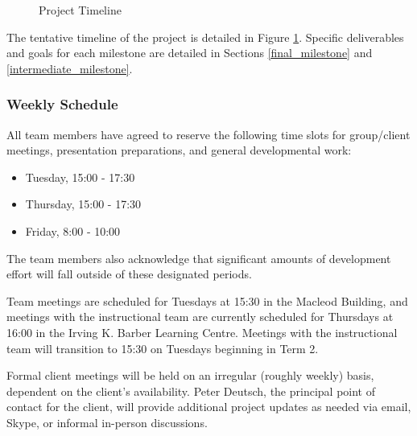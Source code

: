 \begin{figure}[H]
       \caption{Project Timeline}\label{fig:timeline}
\end{figure}

The tentative timeline of the project is detailed in Figure \ref{fig:timeline}. Specific deliverables and goals for each milestone are detailed in Sections \ref{final_milestone} and \ref{intermediate_milestone}.

\subsubsection{Weekly Schedule}

All team members have agreed to reserve the following time slots for group/client meetings, presentation preparations, and general developmental work:
\begin{itemize}
\item Tuesday, 15:00 - 17:30
\item Thursday, 15:00 - 17:30
\item Friday, 8:00 - 10:00
\end{itemize}

The team members also acknowledge that significant amounts of development effort will fall outside of these designated periods.

Team meetings are scheduled for Tuesdays at 15:30 in the Macleod Building, and meetings with the instructional team are currently scheduled for Thursdays at 16:00 in the Irving K. Barber Learning Centre. Meetings with the instructional team will transition to 15:30 on Tuesdays beginning in Term 2.

Formal client meetings will be held on an irregular (roughly weekly) basis, dependent on the client's availability. Peter Deutsch, the principal point of contact for the client, will provide additional project updates as needed via email, Skype, or informal in-person discussions.